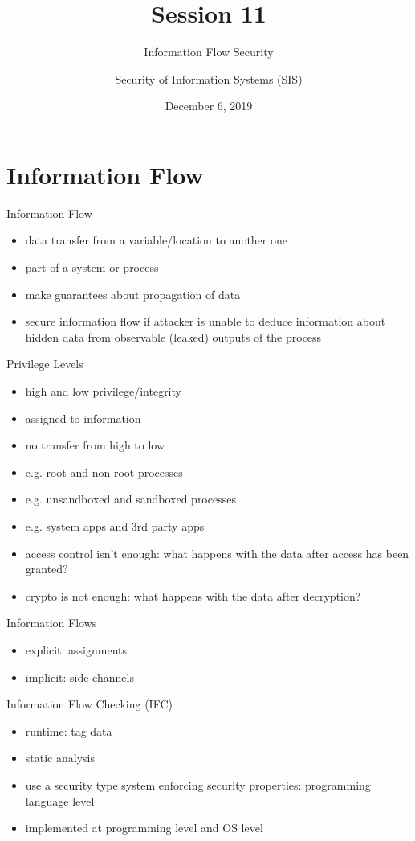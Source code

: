 \documentclass{curs}
\title[Session 11]{Session 11}
\subtitle{Information Flow Security}
\author{Security of Information Systems (SIS)}
\date{December 6, 2019}
\begin{document}
\frame{\titlepage}

\section{Information Flow}

\begin{frame}{Information Flow}
  \begin{itemize}
    \item data transfer from a variable/location to another one
    \item part of a system or process
    \item make guarantees about propagation of data
    \item secure information flow if attacker is unable to deduce information about hidden data from observable (leaked) outputs of the process
  \end{itemize}
\end{frame}

\begin{frame}{Privilege Levels}
  \begin{itemize}
    \item high and low privilege/integrity
    \item assigned to information
    \item no transfer from high to low
    \item e.g. root and non-root processes
    \item e.g. unsandboxed and sandboxed processes
    \item e.g. system apps and 3rd party apps
    \item access control isn't enough: what happens with the data after access has been granted?
    \item crypto is not enough: what happens with the data after decryption?
  \end{itemize}
\end{frame}

\begin{frame}{Information Flows}
  \begin{itemize}
    \item explicit: assignments
    \item implicit: side-channels
  \end{itemize}
\end{frame}

\begin{frame}{Information Flow Checking (IFC)}
  \begin{itemize}
    \item runtime: tag data
    \item static analysis
    \item use a security type system enforcing security properties: programming language level
    \item implemented at programming level and OS level
  \end{itemize}
\end{frame}
\end{document}
